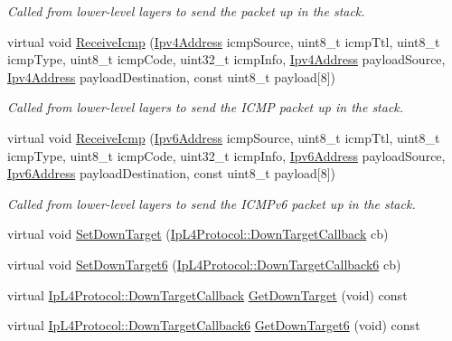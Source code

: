 \begin{DoxyCompactItemize}
\begin{DoxyCompactList}\small\item\em Called from lower-\/level layers to send the packet up in the stack. \end{DoxyCompactList}\item 
virtual void \hyperlink{classns3_1_1UdpL4Protocol_a375027a155ad80373b9274330ffc7b2a}{Receive\+Icmp} (\hyperlink{classns3_1_1Ipv4Address}{Ipv4\+Address} icmp\+Source, uint8\+\_\+t icmp\+Ttl, uint8\+\_\+t icmp\+Type, uint8\+\_\+t icmp\+Code, uint32\+\_\+t icmp\+Info, \hyperlink{classns3_1_1Ipv4Address}{Ipv4\+Address} payload\+Source, \hyperlink{classns3_1_1Ipv4Address}{Ipv4\+Address} payload\+Destination, const uint8\+\_\+t payload\mbox{[}8\mbox{]})
\begin{DoxyCompactList}\small\item\em Called from lower-\/level layers to send the I\+C\+MP packet up in the stack. \end{DoxyCompactList}\item 
virtual void \hyperlink{classns3_1_1UdpL4Protocol_a9b85c5b55d5087aa71233e72b735ed0a}{Receive\+Icmp} (\hyperlink{classns3_1_1Ipv6Address}{Ipv6\+Address} icmp\+Source, uint8\+\_\+t icmp\+Ttl, uint8\+\_\+t icmp\+Type, uint8\+\_\+t icmp\+Code, uint32\+\_\+t icmp\+Info, \hyperlink{classns3_1_1Ipv6Address}{Ipv6\+Address} payload\+Source, \hyperlink{classns3_1_1Ipv6Address}{Ipv6\+Address} payload\+Destination, const uint8\+\_\+t payload\mbox{[}8\mbox{]})
\begin{DoxyCompactList}\small\item\em Called from lower-\/level layers to send the I\+C\+M\+Pv6 packet up in the stack. \end{DoxyCompactList}\item 
virtual void \hyperlink{classns3_1_1UdpL4Protocol_a799b6bb261184bb06ed33d58fe9bddb4}{Set\+Down\+Target} (\hyperlink{classns3_1_1IpL4Protocol_ae3ba76c0a48fbaa90529c528a15f12b6}{Ip\+L4\+Protocol\+::\+Down\+Target\+Callback} cb)
\item 
virtual void \hyperlink{classns3_1_1UdpL4Protocol_a40555d4abc10c25d7a3aa8eb95d5aeaa}{Set\+Down\+Target6} (\hyperlink{classns3_1_1IpL4Protocol_a039f3d1883632ab922fa958fc9ecd97f}{Ip\+L4\+Protocol\+::\+Down\+Target\+Callback6} cb)
\item 
virtual \hyperlink{classns3_1_1IpL4Protocol_ae3ba76c0a48fbaa90529c528a15f12b6}{Ip\+L4\+Protocol\+::\+Down\+Target\+Callback} \hyperlink{classns3_1_1UdpL4Protocol_ad2adccbe57d999c52dd7824481bca718}{Get\+Down\+Target} (void) const 
\item 
virtual \hyperlink{classns3_1_1IpL4Protocol_a039f3d1883632ab922fa958fc9ecd97f}{Ip\+L4\+Protocol\+::\+Down\+Target\+Callback6} \hyperlink{classns3_1_1UdpL4Protocol_af11c07b2d77a3b46a01e44ac9ddbf7c9}{Get\+Down\+Target6} (void) const 
\end{DoxyCompactItemize}
